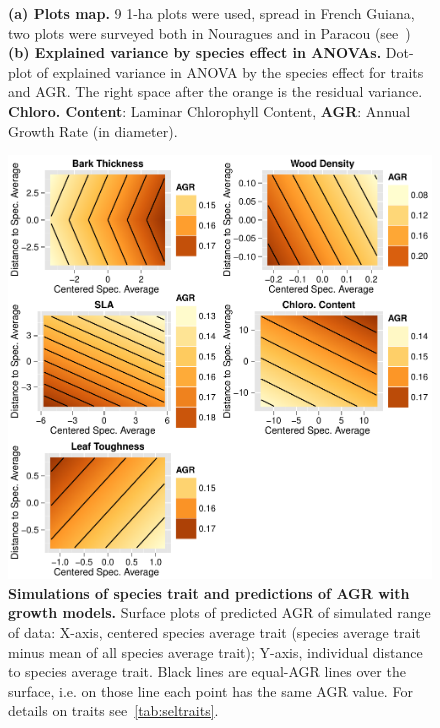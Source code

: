 \begin{figure}[!ht]
\begin{subfigure}[c]{0.5\textwidth}
		\caption{}
		\label{fig:aov}
	\end{subfigure}
	\caption{\textbf{(a) Plots map.} 9 1-ha plots were used, spread in French Guiana, two plots were surveyed both in Nouragues and in Paracou (see~\citealp{baraloto_decoupled_2010}) \textbf{(b) Explained variance by species effect in ANOVAs.} Dot-plot of explained variance in ANOVA by the species effect for traits and AGR. The right space after the orange is the residual variance. \textbf{Chloro. Content}: Laminar Chlorophyll Content, \textbf{AGR}: Annual Growth Rate (in diameter).}
	\label{fig:gen}
\end{figure}

\begin{figure}[!ht]
	\centering
	\includegraphics{figures/Sel_Traits_Simul_Pred_AGR_2015-05-22.pdf}
	\caption{\textbf{Simulations of species trait and predictions of AGR with growth models.} Surface plots of predicted AGR of simulated range of data: X-axis, centered species average trait (species average trait minus mean of all species average trait); Y-axis, individual distance to species average trait. Black lines are equal-AGR lines over the surface, i.e. on those line each point has the same AGR value. For details on traits see~\autoref{tab:seltraits}.}
	\label{fig:simul}
\end{figure}